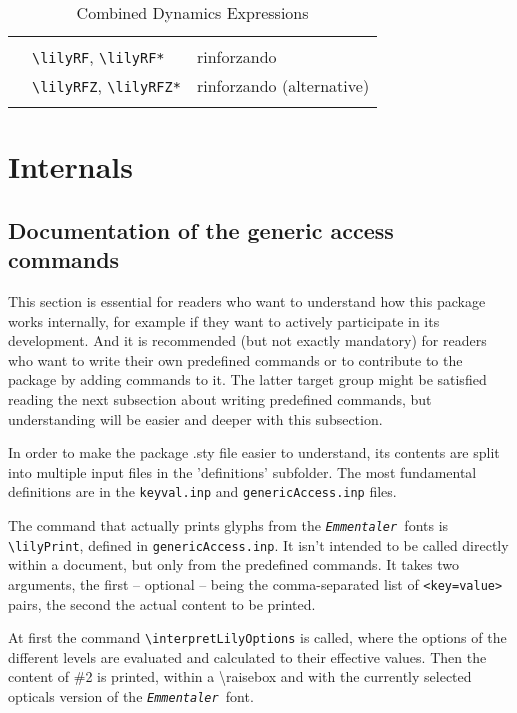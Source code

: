 \documentclass{article}
\newcommand*{\emmentaler}{\texttt{\textit{Emmentaler }}}
\newcommand*{\cmd}[1]{\texttt{\textbackslash #1}}
\newcommand{\tmpCaption}{} %
\newcommand{\tmpLabel}{}
\newenvironment{reftable}[2]
	{%
		\renewcommand{\tmpCaption}{#1}
		\renewcommand{\tmpLabel}{#2}
		\begin{table}[ht]
		\begin{center}
		\begin{tabular}[t]{lll}
		\hline
		&\\
	}
	{%
		&\\
		\hline
		\end{tabular}
		\caption{\tmpCaption}
		\label{table:\tmpLabel}
		\end{center}
		\end{table}
	}
\begin{document}
\begin{reftable}{Combined Dynamics Expressions}{combinedDynLetters}
\lilyRF* & \cmd{lilyRF}, \cmd{lilyRF*} & rinforzando\\
\lilyRFZ* & \cmd{lilyRFZ}, \cmd{lilyRFZ*} & rinforzando (alternative)\\

\end{reftable}

\section{Internals}

\subsection{Documentation of the generic access commands}
This section is essential for readers who want to understand how this package works internally, for example if they want to actively participate in its development.
And it is recommended (but not exactly mandatory) for readers who want to write their own predefined commands or to contribute to the package by adding commands to it. 
The latter target group might be satisfied reading the next subsection about writing predefined commands, but understanding will be easier and deeper with this subsection.

\medskip
In order to make the package .sty file easier to understand, its contents are split into multiple input files in the 'definitions' subfolder. 
The most fundamental definitions are in the \texttt{keyval.inp} and \texttt{genericAccess.inp} files.

\medskip
The command that actually prints glyphs from the \emmentaler fonts is \cmd{lilyPrint}, defined in \texttt{genericAccess.inp}.
It isn't intended to be called directly within a document, but only from the predefined commands.
It takes two arguments, the first -- optional -- being the comma-separated list of \texttt{<key=value>} pairs, the second the actual content to be printed.

At first the command \cmd{interpretLilyOptions} is called, where the options of the different levels are evaluated and calculated to their effective values.
Then the content of \#2 is printed, within a \textbackslash raisebox and with the currently selected opticals version of the \emmentaler font.
\end{document}
